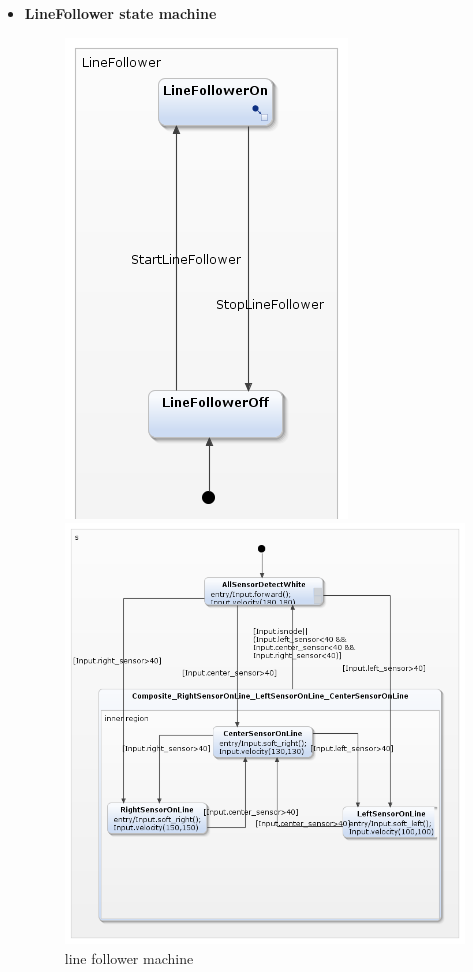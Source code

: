 \documentclass[a4paper,12pt,oneside]{book}
\begin{document}
\begin{itemize}
\item \textbf{LineFollower state machine}

\begin{figure}[!htbp]
	\begin{minipage}{0.45\textwidth}
	\centering
	\includegraphics[scale=.7]{linefollower.png}
	\caption{line follower machine}
	\label{linefollower}
\end{minipage}
	\begin{minipage}{0.45\textwidth}
	\centering
	\includegraphics[scale=.6]{linefollower_on.png}

\end{minipage}
\end{figure}
\end{itemize}
\end{document}
